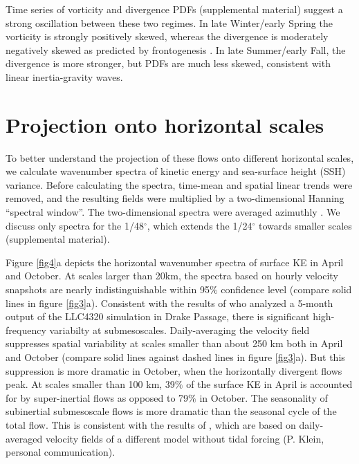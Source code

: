 \documentclass[grl]{agutex2015}
\begin{document}
\begin{article}
 Time series of vorticity and divergence PDFs (supplemental material) suggest
 a strong oscillation between these two regimes. In late Winter/early Spring
 the vorticity is strongly positively skewed, whereas the divergence is moderately
 negatively skewed as predicted by frontogenesis \citep{capet_etal2008a,mcwilliams2016}
. In late Summer/early Fall, the divergence is more stronger, but PDFs are much less skewed,
consistent with linear inertia-gravity waves.

\section{Projection onto horizontal scales}

To better understand the projection of these flows onto different horizontal
scales, we calculate wavenumber spectra of kinetic energy and sea-surface height
(SSH) variance.  Before calculating the spectra, time-mean and spatial linear
trends were removed, and the resulting fields were multiplied by a two-dimensional Hanning ``spectral window''.
The two-dimensional spectra were averaged azimuthly \citep[e.g., ][]{rocha_etal2016} .
We discuss only spectra for the 1/48$^\circ$, which extends the 1/24$^\circ$
towards smaller scales (supplemental material).

Figure \ref{fig4}a depicts the horizontal wavenumber spectra of surface KE in
April and October. At scales larger than 20km, the spectra based on hourly
velocity snapshots are nearly indistinguishable within 95$\%$ confidence level
(compare solid lines in figure \ref{fig3}a). Consistent with the results of
\citet{rocha_etal2016} who analyzed a 5-month output of the LLC4320 simulation in Drake Passage,
there is significant high-frequency variabilty at submesoscales. Daily-averaging
the velocity field suppresses spatial variability at scales smaller than about 250
km both in April and October (compare solid lines against dashed lines in figure
\ref{fig3}a). But this suppression is more dramatic in October, when the horizontally
divergent flows peak. At scales
smaller than 100 km, 39$\%$ of the surface KE in April is accounted for by super-inertial
flows as opposed to 79$\%$ in October. The seasonality of subinertial submesoscale flows
is more dramatic than the seasonal cycle of the total flow. This is consistent
with the results of \citet{sasaki_etal2014}, which are
based on daily-averaged velocity fields of a different model without tidal forcing
(P. Klein, personal communication).


\end{article}
\end{document}
